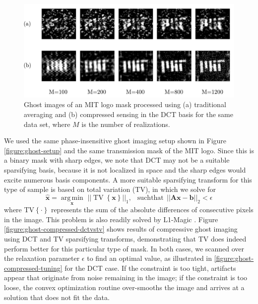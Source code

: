 \begin{figure}[t]
\begin{center}
\includegraphics[width=16cm]{figure-ghost-compressed-bszl1.pdf}
\caption{Ghost images of an MIT logo mask processed using (a) traditional averaging and (b) compressed sensing in the DCT basis for the same data set, where $M$ is the number of realizations.}
\label{figure:ghost-compressed-bszl1}
\end{center}
\end{figure}

We used the same phase-insensitive ghost imaging setup shown in Figure \ref{figure:ghost-setup} and the same transmission mask of the MIT logo. Since this is a binary mask with sharp edges, we note that DCT may not be a suitable sparsifying basis, because it is not localized in space and the sharp edges would excite numerous basis components. A more suitable sparsifying transform for this type of sample is based on total variation (TV), in which we solve for
\begin{equation}
\hat{\mathbf{x}} = \underset{\mathbf{x}}{\operatorname{arg\,min}}\,\,||\operatorname{TV}\left\{\mathbf{x}\right\}||_1,\,\,\, \operatorname{such that}\,||\mathbf{A}\mathbf{x} - \mathbf{b}||_2<\epsilon
\end{equation}
where TV$\left\{\cdot\right\}$ represents the sum of the absolute differences of consecutive pixels in the image. This problem is also readily solved by L1-Magic \cite{l1magic}. Figure \ref{figure:ghost-compressed-dctvstv} shows results of compressive ghost imaging using DCT and TV sparsifying transforms, demonstrating that TV does indeed perform better for this particular type of mask. In both cases, we scanned over the relaxation parameter $\epsilon$ to find an optimal value, as illustrated in \ref{figure:ghost-compressed-tuning} for the DCT case. If the constraint is too tight, artifacts appear that originate from noise remaining in the image; if the constraint is too loose, the convex optimization routine over-smooths the image and arrives at a solution that does not fit the data.

